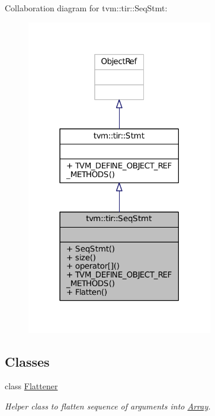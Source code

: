 Collaboration diagram for tvm\+:\+:tir\+:\+:Seq\+Stmt\+:
\nopagebreak
\begin{figure}[H]
\begin{center}
\leavevmode
\includegraphics[width=230pt]{classtvm_1_1tir_1_1SeqStmt__coll__graph}
\end{center}
\end{figure}
\subsection*{Classes}
\begin{DoxyCompactItemize}
\item 
class \hyperlink{classtvm_1_1tir_1_1SeqStmt_1_1Flattener}{Flattener}
\begin{DoxyCompactList}\small\item\em Helper class to flatten sequence of arguments into \hyperlink{classtvm_1_1Array}{Array}. \end{DoxyCompactList}\end{DoxyCompactItemize}
